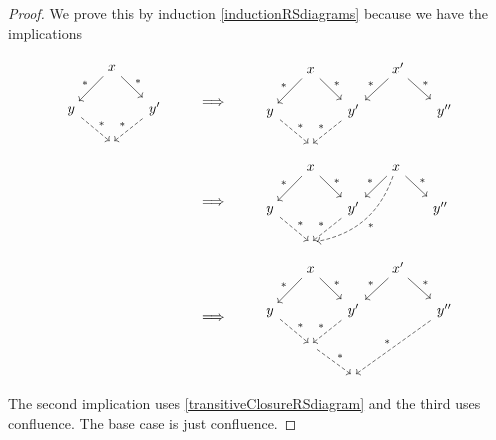 \begin{proof}
We prove this by induction \ref{inductionRSdiagrams} because we have the implications

\begin{align*}
\begin{tikzcd}[column sep=1.5em, row sep=1.5em, ampersand replacement=\&]
{} \& \arrow[dl, swap, "{*}"] x \arrow[dr, "{*}"] \& {} \\
y \arrow[dr, dashed, "{*}"] \& {} \& \arrow[dl, dashed, swap, "{*}"] y' \\
{} \& {} \& {}
\end{tikzcd} \qquad&\implies\qquad \begin{tikzcd}[column sep=1.5em, row sep=1.5em, ampersand replacement=\&]
{} \& \arrow[dl, swap, "{*}"] x \arrow[dr, "{*}"] \& {} \& \arrow[dl, swap, "{*}"] x' \arrow[dr, "{*}"] \& {} \\
y \arrow[dr, dashed, "{*}"] \& {} \& \arrow[dl, dashed, swap, "{*}"] y' \& {} \& y^{\prime\prime} \\
{} \& {} \& {}
\end{tikzcd} \\
&\implies\qquad \begin{tikzcd}[column sep=1.5em, row sep=1.5em, ampersand replacement=\&]
{} \& \arrow[dl, swap, "{*}"] x \arrow[dr, "{*}"] \& {} \& \arrow[dl, swap, "{*}"] x \arrow[dr, "{*}"] \arrow[ddll, dashed, bend left, "{*}"] \& {} \\
y \arrow[dr, dashed, "{*}"] \& {} \& \arrow[dl, dashed, swap, "{*}"] y' \& {} \& y^{\prime\prime} \\
{} \& {} \& {}
\end{tikzcd} \\
&\implies\qquad \begin{tikzcd}[column sep=1.5em, row sep=1.5em, ampersand replacement=\&]
{} \& \arrow[dl, swap, "{*}"] x \arrow[dr, "{*}"] \& {} \& \arrow[dl, swap, "{*}"] x' \arrow[dr, "{*}"] \& {} \\
y \arrow[dr, dashed, "{*}"] \& {} \& \arrow[dl, dashed, swap, "{*}"] y' \& {} \& y^{\prime\prime} \arrow[ddll, dashed, swap, "{*}"] \\
{} \& {} \arrow[dr, dashed, "{*}"] \& {} \\
{} \& {} \& {}
\end{tikzcd}
\end{align*}
The second implication uses \ref{transitiveClosureRSdiagram} and the third uses confluence. The base case is just confluence.
\end{proof}

